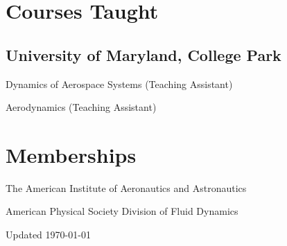 \documentclass[12pt,letterpaper]{report}
\newcommand{\listitemspace}{0.25em}
\renewenvironment{itemize}
{\begin{list}{}{\setlength{\leftmargin}{0em}
                \setlength{\parskip}{0em}
                \setlength{\itemsep}{\listitemspace}
                \setlength{\parsep}{\listitemspace}}}
{\end{list}}
\begin{document}
    \section*{Courses Taught}

    \subsection*{University of Maryland, College Park}
    
    \begin{itemize}

        \item Dynamics of Aerospace Systems (Teaching Assistant)
        \item Aerodynamics (Teaching Assistant)

    \end{itemize}

 
    \section*{Memberships}

    \begin{itemize}

        \item The American Institute of Aeronautics and Astronautics
        \item American Physical Society Division of Fluid Dynamics

    \end{itemize}



    \begin{center}
        \vfill
        Updated \monthyeardate\today
    \end{center}
\end{document}
